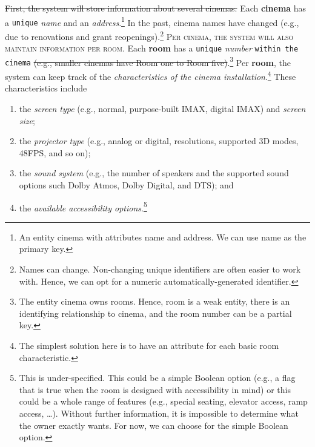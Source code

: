 \documentclass{article}
\newcommand{\ENT}[1]{\textcolor{colA}{\textbf{#1}}}
\newcommand{\AT}[1]{\textcolor{colB}{\textit{#1}}}
\newcommand{\RS}[1]{\textcolor{colC}{\textsc{#1}}}
\newcommand{\CON}[1]{\textcolor{colG}{\texttt{#1}}}
\newcommand{\IR}[1]{\textcolor{black!50}{\sout{#1}}}
\begin{document}
\IR{First, the system will store information about several cinemas.} Each \ENT{cinema} has a \CON{unique} \AT{name} and an \AT{address}.\footnote{An entity cinema with attributes name and address. We can use name as the primary key.} In the past, cinema names have changed (e.g., due to renovations and grant reopenings).\footnote{Names can change. Non-changing unique identifiers are often easier to work with. Hence, we can opt for a numeric automatically-generated identifier.} \RS{Per cinema, the system will also maintain information per room}. Each \ENT{room} has a \CON{unique} \AT{number} \CON{within the cinema} \IR{(e.g., smaller cinemas have Room one to Room five)}.\footnote{The entity cinema owns rooms. Hence, room is a weak entity, there is an identifying relationship to cinema, and the room number can be a partial key.} Per \ENT{room}, the system can keep track of the \AT{characteristics of the cinema installation}.\footnote{The simplest solution here is to have an attribute for each basic room characteristic.} These characteristics include
\begin{enumerate}
\item the \AT{\emph{screen type}} (e.g., normal, purpose-built IMAX, digital IMAX) and \AT{\emph{screen size}};
\item the \AT{\emph{projector type}} (e.g., analog or digital, resolutions, supported 3D modes,  48FPS, and so on);
\item the \AT{\emph{sound system}} (e.g., the number of speakers and the supported sound options such Dolby Atmos, Dolby Digital, and DTS); and
\item the \AT{\emph{available accessibility options}}.\footnote{This is under-specified. This could be a simple Boolean option (e.g., a flag that is true when the room is designed with accessibility in mind) or this could be a whole range of features (e.g., special seating, elevator access, ramp access, \dots). Without further information, it is impossible to determine what the owner exactly wants. For now, we can choose for the simple Boolean option.}
\end{enumerate}
\end{document}
